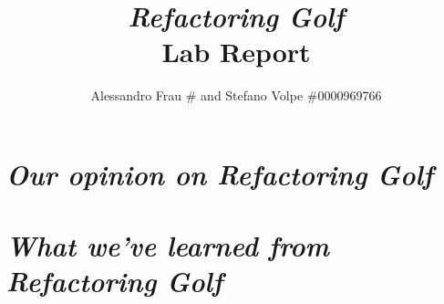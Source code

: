 \documentclass{article}
\title{
  \emph{Refactoring Golf} \\
  \large{Lab Report}
}
\author{Alessandro Frau \# and Stefano Volpe \#0000969766}
\begin{document}
  \maketitle

  \section{\emph{Our opinion on Refactoring Golf}}

  \section{\emph{What we've learned from Refactoring Golf}}
\end{document}

